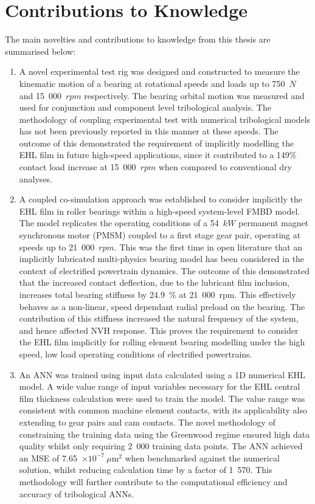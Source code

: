 \section{Contributions to Knowledge} \label{Contribution to Knowledge}

The main novelties and contributions to knowledge from this thesis are summarised below:

\begin{enumerate}
	\item A novel experimental test rig was designed and constructed to measure the kinematic motion of a bearing at rotational speeds and loads up to 750~$N$ and 15~000~$rpm$ respectively. The bearing orbital motion was measured and used for conjunction and component level tribological analysis. The methodology of coupling experimental test with numerical tribological models has not been previously reported in this manner at these speeds. The outcome of this demonstrated the requirement of implicitly modelling the EHL film in future high-speed applications, since it contributed to a 149\% contact load increase at 15~000~$rpm$ when compared to conventional dry analyses.
	
	\item A coupled co-simulation approach was established to consider implicitly the EHL film in roller bearings within a high-speed system-level FMBD model. The model replicates the operating conditions of a 54~$kW$ permanent magnet synchronous motor (PMSM) coupled to a first stage gear pair, operating at speeds up to 21~000~$rpm$. This was the first time in open literature that an implicitly lubricated multi-physics bearing model has been considered in the context of electrified powertrain dynamics. The outcome of this demonstrated that the increased contact deflection, due to the lubricant film inclusion, increases total bearing stiffness by 24.9~\% at 21~000~rpm. This effectively behaves as a non-linear, speed dependant radial preload on the bearing. The contribution of this stiffness increased the natural frequency of the system, and hence affected NVH response. This proves the requirement to consider the EHL film implicitly for rolling element bearing modelling under the high speed, low load operating conditions of electrified powertrains.
	
	\item An ANN was trained using input data calculated using a 1D numerical EHL model. A wide value range of input variables necessary for the EHL central film thickness calculation were used to train the model. The value range was consistent with common machine element contacts, with its applicability also extending to gear pairs and cam contacts. The novel methodology of constraining the training data using the Greenwood regime ensured high data quality whilst only requiring 2~000 training data points. The ANN achieved an MSE of 7.65~$\times 10^{-7}~\mu \mathrm{m}^2$ when benchmarked against the numerical solution, whilst reducing calculation time by a factor of 1~570. This methodology will further contribute to the computational efficiency and accuracy of tribological ANNs.
	

\end{enumerate}
